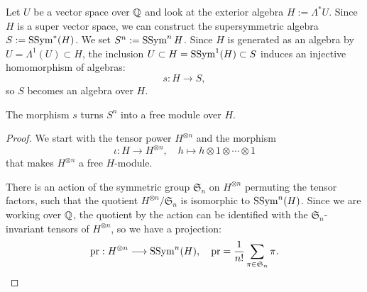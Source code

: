 Let $U$ be a vector space over $\mathbb{Q}$ and look at the exterior algebra $H:= \Lambda^* U$. Since $H$ is a super vector space, we can construct the supersymmetric algebra $S:= \operatorname{SSym}^*(H)$. 
We set $S^n:= \operatorname{SSym}^n H$.
Since $H$ is generated as an algebra by $U=\Lambda^1(U)\subset H$, the inclusion $U\subset H = \operatorname{SSym}^1(H)\subset S$ induces an injective homomorphism of algebras:
$$ s : H \longrightarrow S, $$
so $S$ becomes an algebra over $H$.
\begin{lemma}
The morphism $s$ turns $S^n$ into a free module over $H$.
\end{lemma}
\begin{proof}
We start with the tensor power $H^{\otimes n}$ and the morphism 
$$
\iota : H \longrightarrow H^{\otimes n},\quad h\longmapsto h\otimes 1\otimes\cdots\otimes 1
$$
that makes $H^{\otimes n}$ a free $H$-module.

There is an action of the symmetric group $\mathfrak S_n$ on $H^{\otimes n}$ permuting the tensor factors, such that the quotient $H^{\otimes n}/\mathfrak S_n$ is isomorphic to $\operatorname{SSym}^n (H)$. Since we are working over $\mathbb{Q}$, the quotient by the action can be identified with the $\mathfrak S_n$-invariant tensors of $H^{\otimes n}$, so we have a projection:
$$
\operatorname{pr} : H^{\otimes n} \longrightarrow \operatorname{SSym}^n (H), \quad \operatorname{pr} = \frac{1}{n!}\sum_{\pi \in\mathfrak S_n} \pi.
$$

\end{proof}

